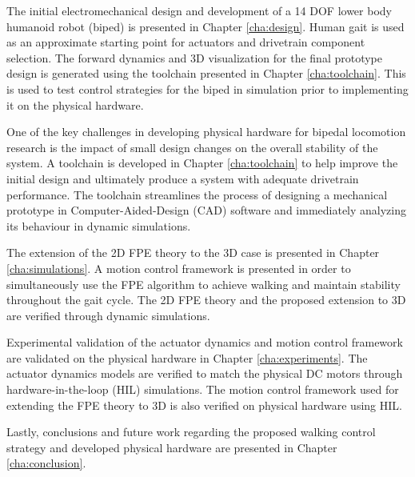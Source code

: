 The initial electromechanical design and development of a 14 DOF lower body humanoid robot (biped) is presented in Chapter \ref{cha:design}. Human gait is used as an approximate starting point for actuators and drivetrain component selection. The forward dynamics and 3D visualization for the final prototype design is generated using the toolchain presented in Chapter \ref{cha:toolchain}. This is used to test control strategies for the biped in simulation prior to implementing it on the physical hardware.

One of the key challenges in developing physical hardware for bipedal locomotion research is the impact of small design changes on the overall stability of the system. A toolchain is developed in Chapter \ref{cha:toolchain} to help improve the initial design and ultimately produce a system with adequate drivetrain performance. The toolchain streamlines the process of designing a mechanical prototype in Computer-Aided-Design (CAD) software and immediately analyzing its behaviour in dynamic simulations.

The extension of the 2D FPE theory to the 3D case is presented in Chapter \ref{cha:simulations}. A motion control framework is presented in order to simultaneously use the FPE algorithm to achieve walking and maintain stability throughout the gait cycle. The 2D FPE theory and the proposed extension to 3D are verified through dynamic simulations. 

Experimental validation of the actuator dynamics and motion control framework are validated on the physical hardware in Chapter \ref{cha:experiments}. The actuator dynamics models are verified to match the physical DC motors through hardware-in-the-loop (HIL) simulations. The motion control framework used for extending the FPE theory to 3D is also verified on physical hardware using HIL.  

Lastly, conclusions and future work regarding the proposed walking control strategy and developed physical hardware are presented in Chapter \ref{cha:conclusion}. 

